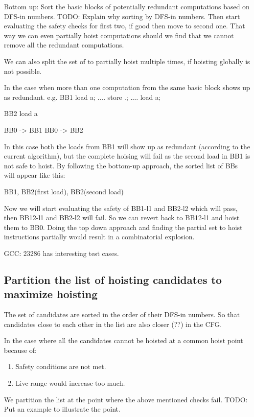 \begin{section}
Bottom up:
Sort the basic blocks of potentially redundant computations based on DFS-in numbers.
TODO: Explain why sorting by DFS-in numbers.
Then start evaluating the safety checks for first two, if good then move to second one. That way we can even
partially hoist computations should we find that we cannot remove all the redundant computations.

We can also split the set of to partially hoist multiple times, if hoisting globally is not possible.

In the case when more than one computation from the same basic block shows up as redundant.
e.g.
BB1
load a;
....
store .;
....
load a;


BB2
load a

BB0 -> BB1
BB0 -> BB2

In this case both the loads from BB1 will show up as redundant (according to the current algorithm), but the complete
hoising will fail as the second load in BB1 is not safe to hoist. By following the bottom-up approach, the sorted list
of BBs will appear like this:

{ BB1, BB2(first load), BB2(second load) }

Now we will start evaluating the safety of BB1-l1 and BB2-l2 which will pass, then BB12-l1 and BB2-l2 will fail.
So we can revert back to BB12-l1 and hoist them to BB0. Doing the top down approach and finding the partial set
to hoist instructions partially would result in a combinatorial explosion.

GCC: 23286 has interesting test cases.

\section{Partition the list of hoisting candidates to maximize hoisting}
The set of candidates are sorted in the order of their DFS-in numbers. So that candidates close to
each other in the list are also closer (??) in the CFG.

In the case where all the candidates cannot be hoisted at a common hoist point because of:
\begin{enumerate}
\item Safety conditions are not met.
\item Live range would increase too much.
\end{enumerate}

We partition the list at the point where the above mentioned checks fail.
TODO: Put an example to illustrate the point.


\end{section}
